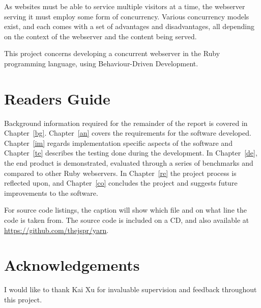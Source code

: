 %
As websites must be able to service multiple visitors at a time, the
webserver serving it must employ some form of concurrency. Various concurrency
models exist, and each comes with a set of advantages and disadvantages, all
depending on the context of the webserver and the content being served.

This project concerns developing a concurrent webserver in the Ruby
programming language, using Behaviour-Driven Development.

\section{Readers Guide}
Background information required for the remainder of the report is covered in
Chapter~\ref{bg}. Chapter~\ref{an} covers the requirements for the software
developed. Chapter~\ref{im} regards implementation specific aspects of the
software and Chapter~\ref{te} describes the testing done during the
development. In Chapter~\ref{de}, the end product is demonstrated,
evaluated through a series of benchmarks and compared to other Ruby
webservers. In Chapter~\ref{re} the project process is reflected upon, and
Chapter~\ref{co} concludes the project and suggests future improvements to the
software.

For source code listings, the caption will show which file and on what line
the code is taken from. The source code is included on a CD, and also
available at \url{https://github.com/thejspr/yarn}.


\section{Acknowledgements}
I would like to thank Kai Xu for invaluable supervision and feedback
throughout this project.
